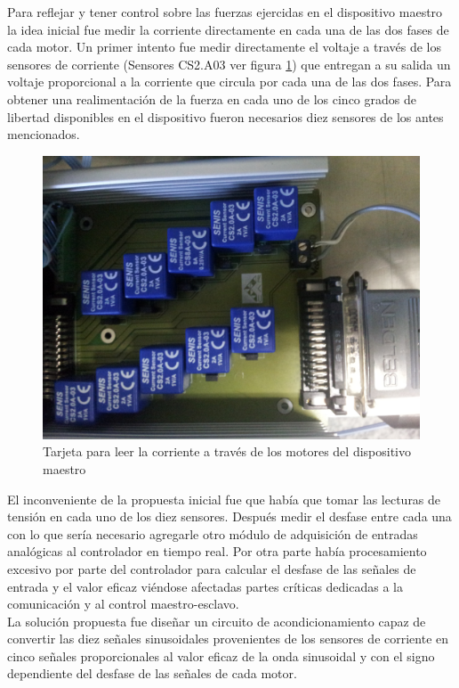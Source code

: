 Para reflejar y tener control sobre las fuerzas ejercidas en el dispositivo maestro la idea inicial fue medir la corriente directamente en cada una de las dos fases de cada motor. Un primer intento fue medir directamente el voltaje a través de los sensores de corriente (Sensores CS2.A03 ver figura \ref{fig:sensoresCorriente}) que entregan a su salida un voltaje proporcional a la corriente que circula por cada una de las dos fases. Para obtener una realimentación de la fuerza en cada uno de los cinco grados de libertad disponibles en el dispositivo fueron necesarios diez sensores de los antes mencionados.\\

\begin{figure}[!htb]
\centering
\includegraphics[scale=0.07]{FiguresP/CurrentSensors}
\caption{Tarjeta para leer la corriente a través de los motores del dispositivo maestro}
\label{fig:sensoresCorriente}
\end{figure}


El inconveniente de la propuesta inicial fue que había que tomar las lecturas de tensión en cada uno de los diez sensores. Después medir el desfase entre cada una con lo que ser\'ia necesario agregarle otro módulo de adquisición de entradas analógicas al controlador en tiempo real. Por otra parte había procesamiento excesivo por parte del controlador  para calcular el desfase de las señales de entrada y el valor eficaz vi\'endose afectadas partes críticas dedicadas a la comunicación y al control maestro-esclavo.\\


La solución propuesta fue diseñar un circuito de acondicionamiento capaz de convertir las diez señales sinusoidales provenientes de los sensores de corriente en cinco señales proporcionales al valor eficaz de la onda sinusoidal y con el signo dependiente del desfase de las señales de cada motor. \\

